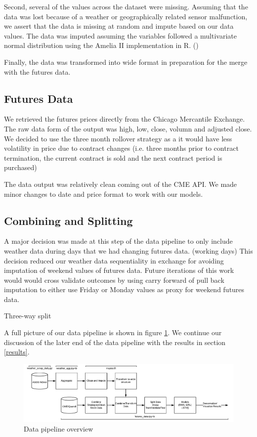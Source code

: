 \documentclass[twoside,11pt]{article}
\begin{document}
	Second, several of the values across the dataset were missing. Assuming that the data was lost because of a weather or geographically related sensor malfunction, we assert that the data is missing at random and impute based on our data values. The data was imputed assuming the variables followed a multivariate normal distribution using the Amelia II implementation in R. (\cite{ameila})
	
	Finally, the data was transformed into wide format in preparation for the merge with the futures data. 

\subsection{Futures Data}
 
We retrieved the futures prices directly from the Chicago Mercantile Exchange. The raw data form of the output was high, low, close, volumn and adjusted close. We decided to use the three month rollover strategy as a it would have less volatility in price due to contract changes (i.e. three months prior to contract termination, the current contract is sold and the next contract period is purchased)

The data output was relatively clean coming out of the CME API. We made minor changes to date and price format to work with our models.

\subsection{Combining and Splitting}

A major decision was made at this step of the data pipeline to only include weather data during days that we had changing futures data. (working days) This decision reduced our weather data sequentiality in exchange for avoiding imputation of weekend values of futures data. Future iterations of this work would would cross validate outcomes by using carry forward of pull back imputation to either use Friday or Monday values as proxy for weekend futures data. 

Three-way split

A full picture of our data pipeline is shown in figure \ref{fig:datapipeline}. We continue our discussion of the later end of the data pipeline with the results in section \ref{results}.

\begin{figure}[htbp]
	\centering
	\includegraphics[width=5in]{DataPipeline.png}
	\caption{Data pipeline overview}
	\label{fig:datapipeline}
\end{figure}
\end{document}
